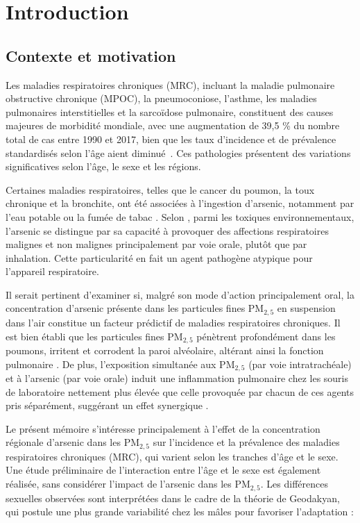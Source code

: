 \chapter{Introduction}
\label{chap:intro}

\section{Contexte et motivation}

Les maladies respiratoires chroniques (MRC), incluant la maladie pulmonaire obstructive chronique (MPOC), la pneumoconiose, l'asthme, les maladies pulmonaires interstitielles et la sarcoïdose pulmonaire, constituent des causes majeures de morbidité mondiale, avec une augmentation de 39,5 \% du nombre total de cas entre 1990 et 2017, bien que les taux d'incidence et de prévalence standardisés selon l'âge aient diminué \citep{Xie2020}. Ces pathologies présentent des variations significatives selon l'âge, le sexe et les régions.

Certaines maladies respiratoires, telles que le cancer du poumon, la toux chronique et la bronchite, ont été associées à l’ingestion d’arsenic, notamment par l’eau potable ou la fumée de tabac \citep{Parvez2009ArsenicCOPD, Smith2006, RAMSEY2023381, Sengupta14082025}. Selon \citep{RAMSEY2023381}, parmi les toxiques environnementaux, l’arsenic se distingue par sa capacité à provoquer des affections respiratoires malignes et non malignes principalement par voie orale, plutôt que par inhalation. Cette particularité en fait un agent pathogène atypique pour l’appareil respiratoire.

Il serait pertinent d’examiner si, malgré son mode d’action principalement oral, la concentration d’arsenic présente dans les particules fines PM$_{2{,}5}$ en suspension dans l’air constitue un facteur prédictif de maladies respiratoires chroniques. Il est bien établi que les particules fines PM$_{2{,}5}$ pénètrent profondément dans les poumons, irritent et corrodent la paroi alvéolaire, altérant ainsi la fonction pulmonaire \citep{Xing2016PM25}. De plus, l’exposition simultanée aux PM$_{2{,}5}$ (par voie intratrachéale) et à l’arsenic (par voie orale) induit une inflammation pulmonaire chez les souris de laboratoire nettement plus élevée que celle provoquée par chacun de ces agents pris séparément, suggérant un effet synergique \citep{RivasSantiago2024}.

Le présent mémoire s'intéresse principalement à l'effet de la concentration régionale d'arsenic dans les PM$_{2{,}5}$ sur l'incidence et la prévalence des maladies respiratoires chroniques (MRC), qui varient selon les tranches d'âge et le sexe. Une étude préliminaire de l'interaction entre l'âge et le sexe est également réalisée, sans considérer l'impact de l'arsenic dans les PM$_{2{,}5}$. Les différences sexuelles observées sont interprétées dans le cadre de la théorie de Geodakyan, qui postule une plus grande variabilité chez les mâles pour favoriser l'adaptation \citep{Geodakyan18082015} :

